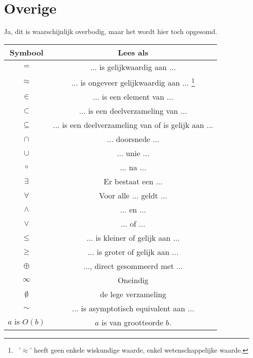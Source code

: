 \documentclass[lineaire_algebra_oplossingen.tex]{subfiles}
\begin{document}
\section{Overige}
Ja, dit is waarschijnlijk overbodig, maar het wordt hier toch opgesomd.
\begin{center}
\begin{savenotes}
\begin{tabular}{| c | c |}
\hline
Symbool & Lees als\\
\hline
$=$ & ... is gelijkwaardig aan ...\\
$\approx$ & ... is ongeveer gelijkwaardig aan ... \footnote{\ '$\approx$' heeft geen enkele wiskundige waarde, enkel wetenschappelijke waarde.}\\
$\in$ & ... is een element van ...\\
$\subset$ & ... is een deelverzameling van ...\\
$\subseteq$ & ... is een deelverzameling van of is gelijk aan ...\\
$\cap$ & ... doorsnede ...\\
$\cup$ & ... unie ...\\
$\circ$ & ... na ...\\
$\exists$ & Er bestaat een ...\\
$\forall$ & Voor alle ... geldt ...\\
$\wedge$ & ... en ...\\
$\vee$ & ... of ...\\
$\leq$ & ... is kleiner of gelijk aan ...\\
$\geq$ & ... is groter of gelijk aan ...\\
$\oplus$ & ..., direct gesommeerd met ...\\
$\infty$ & Oneindig\\
$\emptyset$ & de lege verzameling\\
$\sim$ & ... is asymptotisch equivalent aan ...\\
$a \text{ is } O(b)$ & $a$ is van grootteorde $b$.\\
\hline
\end{tabular}
\end{savenotes}
\end{center}
\end{document}
